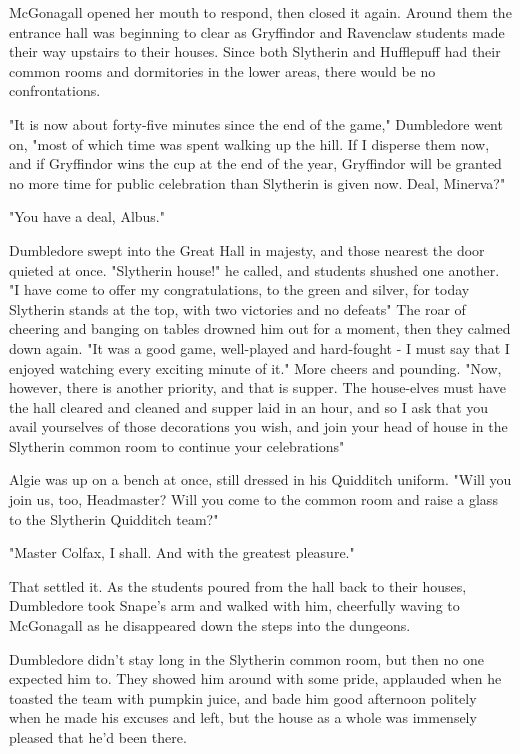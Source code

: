 McGonagall opened her mouth to respond, then closed it again. Around them the entrance hall was beginning to clear as Gryffindor and Ravenclaw students made their way upstairs to their houses. Since both Slytherin and Hufflepuff had their common rooms and dormitories in the lower areas, there would be no confrontations.

"It is now about forty-five minutes since the end of the game," Dumbledore went on, "most of which time was spent walking up the hill. If I disperse them now, and if Gryffindor wins the cup at the end of the year, Gryffindor will be granted no more time for public celebration than Slytherin is given now. Deal, Minerva?"

"You have a deal, Albus."

Dumbledore swept into the Great Hall in majesty, and those nearest the door quieted at once. "Slytherin house!" he called, and students shushed one another. "I have come to offer my congratulations, to the green and silver, for today Slytherin stands at the top, with two victories and no defeats{\el}" The roar of cheering and banging on tables drowned him out for a moment, then they calmed down again. "It was a good game, well-played and hard-fought - I must say that I enjoyed watching every exciting minute of it." More cheers and pounding. "Now, however, there is another priority, and that is supper. The house-elves must have the hall cleared and cleaned and supper laid in an hour, and so I ask that you avail yourselves of those decorations you wish, and join your head of house in the Slytherin common room to continue your celebrations{\el}"

Algie was up on a bench at once, still dressed in his Quidditch uniform. "Will you join us, too, Headmaster? Will you come to the common room and raise a glass to the Slytherin Quidditch team?"

"Master Colfax, I shall. And with the greatest pleasure."

That settled it. As the students poured from the hall back to their houses, Dumbledore took Snape's arm and walked with him, cheerfully waving to McGonagall as he disappeared down the steps into the dungeons.

Dumbledore didn't stay long in the Slytherin common room, but then no one expected him to. They showed him around with some pride, applauded when he toasted the team with pumpkin juice, and bade him good afternoon politely when he made his excuses and left, but the house as a whole was immensely pleased that he'd been there.

